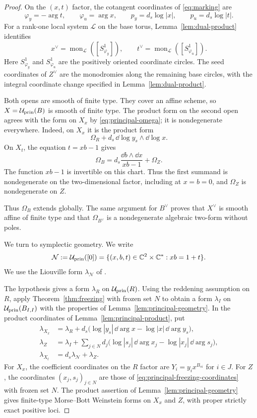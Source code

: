 \documentclass[12pt, letter]{amsart}
\theoremstyle{definition}
\newcommand{\Nn}{\mathcal N}
\newcommand{\pr}{\mathrm{prin}}
\numberwithin{equation}{section}
\begin{document}
\begin{proof}
On the $(x,t)$ factor, the cotangent coordinates of
\eqref{eq:marking} are
\[
 \varphi_y=-\arg t,\qquad \varphi_u=\arg x,\qquad
 p_y=d_s\log|x|,\qquad p_u=d_s\log|t|.
\]
For a rank-one local system $\mathcal L$ on the base torus,
Lemma~\ref{lem:dual-product} identifies
\[
 x^\vee=\operatorname{mon}_{\mathcal L}([S^1_{\varphi_y}]),
 \qquad
 t^\vee=\operatorname{mon}_{\mathcal L}([S^1_{\varphi_u}]).
\]
Here $S^1_{\varphi_y}$ and $S^1_{\varphi_u}$ are the positively
oriented coordinate circles. The seed coordinates of $Z^\vee$
are the monodromies along the remaining base circles, with the
integral coordinate change specified in Lemma~\ref{lem:dual-product}.


Both opens are smooth of finite type. They cover an affine scheme,
so $X= \cU_{\pr}(B)$ is smooth of finite type. The product form on the
second open agrees with the form on $X_x$ by
\eqref{eq:principal-omega}; it is nondegenerate everywhere. 
Indeed, on $X_x$ it is the product form
\[
 \Omega_R+d_s\,\dd\log y_s\wedge\dd\log x.
\]
On $X_t$, the equation $t=xb-1$ gives
\[
 \Omega_B=d_s\frac{\dd b\wedge\dd x}{xb-1}+\Omega_Z.
\]
The function $xb-1$ is invertible on this chart. Thus the first
summand is nondegenerate on the two-dimensional factor, including
at $x=b=0$, and $\Omega_Z$ is nondegenerate on $Z$.

Thus $\Omega_B$ extends globally. The same argument for $B^\vee$ proves
that $X^\vee$ is smooth affine of finite type
and that $\Omega_{B^\vee}$ is a nondegenerate algebraic two-form without poles.




We turn to symplectic geometry. We write 
\[
 \Nn:=\cU_{\pr}([0])
 =\{(x,b,t)\in\C^2\times\C^*:xb=1+t\}.
\]
 We use the Liouville form $\lambda_{\Nn}$ of
\cite[Section~4.2]{HS}.



The hypothesis gives a form $\lambda_R$ on $\cU_{\pr}(R)$.
Using the reddening assumption on $R$, apply Theorem~\ref{thm:freezing}
with frozen set $N$ to obtain a form $\lambda_I$ on
$\cU_{\pr}(B_{I,I})$ with the properties of Lemma~\ref{lem:principal-geometry}.
In the product coordinates of Lemma~\ref{lem:principal-product}, put
\[
 \begin{aligned}
 \lambda_{X_x}
 &=\lambda_R+d_s\bigl(\log|y_s|\,\dd\arg x
                         -\log|x|\,\dd\arg y_s\bigr),\\
 \lambda_Z
 &=\lambda_I+\sum_{j\in N}d_j
       \bigl(\log|s_j|\,\dd\arg x_j
                         -\log|x_j|\,\dd\arg s_j\bigr),\\
 \lambda_{X_t}&=d_s\lambda_{\Nn}+\lambda_Z.
 \end{aligned}
\]
For $X_x$, the coefficient coordinates on the $R$ factor are
$Y_i=y_i x^{B_{si}}$ for $i\in J$.
For $Z$, the coordinates $(x_j,s_j)_{j\in N}$ are those of
\eqref{eq:principal-freezing-coordinates} with frozen set $N$.
The product assertion of Lemma~\ref{lem:principal-geometry}
gives finite-type Morse--Bott Weinstein forms on $X_x$ and $Z$,
with proper strictly exact positive loci.




\end{proof}
\end{document}
